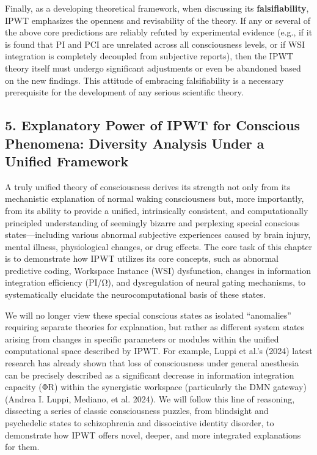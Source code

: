\documentclass[
  a4paper]{article}
\begin{document}
Finally, as a developing theoretical framework, when discussing its
\textbf{falsifiability}, IPWT emphasizes the openness and revisability
of the theory. If any or several of the above core predictions are
reliably refuted by experimental evidence (e.g., if it is found that PI
and PCI are unrelated across all consciousness levels, or if WSI
integration is completely decoupled from subjective reports), then the
IPWT theory itself must undergo significant adjustments or even be
abandoned based on the new findings. This attitude of embracing
falsifiability is a necessary prerequisite for the development of any
serious scientific theory.

\subsection{5. Explanatory Power of IPWT for Conscious Phenomena:
Diversity Analysis Under a Unified
Framework}\label{explanatory-power-of-ipwt-for-conscious-phenomena-diversity-analysis-under-a-unified-framework}

A truly unified theory of consciousness derives its strength not only
from its mechanistic explanation of normal waking consciousness but,
more importantly, from its ability to provide a unified, intrinsically
consistent, and computationally principled understanding of seemingly
bizarre and perplexing special conscious states---including various
abnormal subjective experiences caused by brain injury, mental illness,
physiological changes, or drug effects. The core task of this chapter is
to demonstrate how IPWT utilizes its core concepts, such as abnormal
predictive coding, Workspace Instance (WSI) dysfunction, changes in
information integration efficiency (PI/Ω), and dysregulation of neural
gating mechanisms, to systematically elucidate the neurocomputational
basis of these states.

We will no longer view these special conscious states as isolated
``anomalies'' requiring separate theories for explanation, but rather as
different system states arising from changes in specific parameters or
modules within the unified computational space described by IPWT. For
example, Luppi et al.'s (2024) latest research has already shown that
loss of consciousness under general anesthesia can be precisely
described as a significant decrease in information integration capacity
(ΦR) within the synergistic workspace (particularly the DMN gateway)
(Andrea I. Luppi, Mediano, et al. 2024). We will follow this line of
reasoning, dissecting a series of classic consciousness puzzles, from
blindsight and psychedelic states to schizophrenia and dissociative
identity disorder, to demonstrate how IPWT offers novel, deeper, and
more integrated explanations for them.
\end{document}

